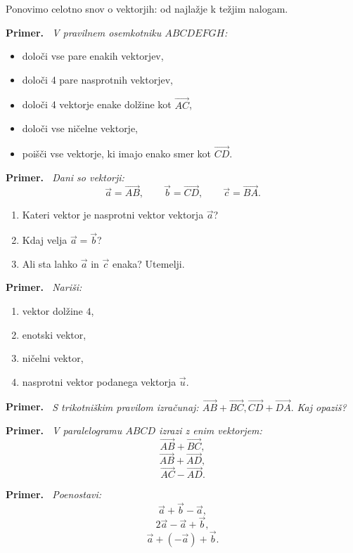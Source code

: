 \documentclass[a4paper,11pt]{article}
\newenvironment{primer}{%
  \par\medskip\noindent\textbf{Primer.}\itshape\ }{\par\medskip}
\begin{document}
Ponovimo celotno snov o vektorjih: od najlažje k težjim nalogam.\\

\begin{primer}
    V pravilnem osemkotniku $ABCDEFGH$:
    \begin{itemize}
        \item določi vse pare enakih vektorjev,
        \item določi 4 pare nasprotnih vektorjev,
        \item določi 4 vektorje enake dolžine kot $\vec{AC}$, 
        \item določi vse ničelne vektorje,
        \item poišči vse vektorje, ki imajo enako smer kot $\vec{CD}$.
    \end{itemize}
\end{primer}
\begin{primer}
    Dani so vektorji:
    \[     \vec{a}=\vec{AB}, \qquad \vec{b}=\vec{CD}, \qquad \vec{c}=\vec{BA}.     \]
    \begin{enumerate}
        \item Kateri vektor je nasprotni vektor vektorja $\vec{a}$?
        \item Kdaj velja $\vec{a}=\vec{b}$?
        \item Ali sta lahko $\vec{a}$ in $\vec{c}$ enaka? Utemelji.
    \end{enumerate}
\end{primer}
\begin{primer}
    Nariši:
    \begin{enumerate}
        \item vektor dolžine $4$,
        \item enotski vektor,
        \item ničelni vektor,
        \item nasprotni vektor podanega vektorja $\vec{u}$.
    \end{enumerate}
\end{primer}
\begin{primer}
    S trikotniškim pravilom izračunaj:
    $\vec{AB}+\vec{BC},
    \vec{CD}+\vec{DA}.$
    Kaj opaziš?
\end{primer}
\begin{primer}
    V paralelogramu $ABCD$ izrazi z enim vektorjem:
    \[     \vec{AB}+\vec{BC},    \]
    \[    \vec{AB}+\vec{AD},    \]
    \[    \vec{AC}-\vec{AD}.    \]
\end{primer}
\begin{primer}
    Poenostavi: %
    \[    \vec{a}+\vec{b}-\vec{a},    \]
    \[    2\vec{a}-\vec{a}+\vec{b},    \]
    \[    \vec{a}+(-\vec{a})+\vec{b}.    \]
\end{primer}
\end{document}
